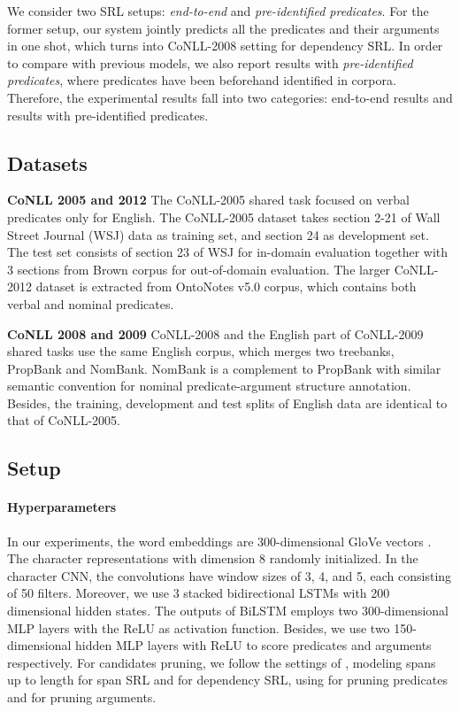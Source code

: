 \documentclass[letterpaper]{article} \usepackage{aaai19}  \usepackage{times}  \usepackage{helvet}  \usepackage{courier}  \usepackage{url}  \usepackage{graphicx}  \frenchspacing  \setlength{\pdfpagewidth}{8.5in}  \setlength{\pdfpageheight}{11in}
\begin{document}
We consider two SRL setups: \textit{end-to-end} and \textit{pre-identified predicates}. 
For the former setup, our system jointly predicts all the predicates and their arguments in one shot, which turns into CoNLL-2008 setting for dependency SRL. In order to compare with previous models, we also report results with \textit{pre-identified predicates}, where predicates have been beforehand identified in corpora. Therefore, the experimental results fall into two categories: end-to-end results and results with pre-identified predicates. 



\subsection{Datasets}


\noindent \textbf{CoNLL 2005 and 2012} \quad The CoNLL-2005 shared task focused on verbal predicates only for English.
The CoNLL-2005 dataset takes section 2-21 of Wall Street Journal (WSJ) data as training set, and section 24 as development set. The test set consists of section 23 of WSJ for in-domain evaluation together with 3 sections from Brown corpus for out-of-domain evaluation. The larger CoNLL-2012 dataset is extracted from OntoNotes v5.0 corpus, which contains both verbal and nominal predicates.



\noindent \textbf{CoNLL 2008 and 2009} \quad
CoNLL-2008 and the English part of CoNLL-2009 shared tasks use the same English corpus, 
which merges two treebanks, PropBank and NomBank. NomBank is a complement to PropBank with similar semantic convention for nominal predicate-argument structure annotation. Besides, the training, development and test splits of English data are identical to that of CoNLL-2005.





\subsection{Setup}
\paragraph{Hyperparameters}


In our experiments, the word embeddings are 300-dimensional GloVe vectors \cite{penningtonEMNLP2014}. The character representations with dimension 8 randomly initialized. In the character CNN, the convolutions  have window sizes of 3, 4, and 5, each consisting of 50 filters. Moreover, we use 3 stacked bidirectional LSTMs with 200 dimensional hidden states. The outputs of BiLSTM employs two 300-dimensional MLP layers with the ReLU as activation function.
Besides, we use two 150-dimensional hidden MLP layers with ReLU to score predicates and arguments respectively. For candidates pruning, we follow the settings of \citeauthor{he2018jointly} , modeling spans up to length  for span SRL and  for dependency SRL, using  for pruning predicates and  for pruning arguments.
\end{document}
